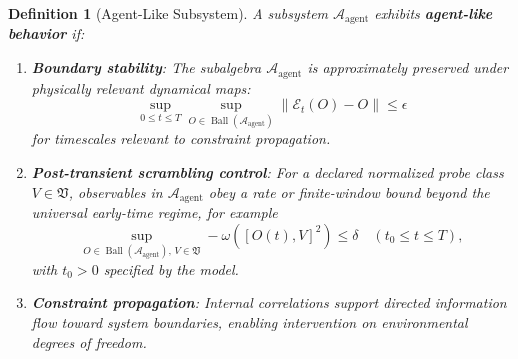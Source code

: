 \documentclass[12pt,a4paper,openany]{book}
\newtheorem{definition}[theorem]{Definition}
\begin{document}
\begin{definition}[Agent-Like Subsystem]
\label{H-C-def:agent-subsystem}
A subsystem $\mathcal{A}_{\text{agent}}$ exhibits \textbf{agent-like behavior} if:
\begin{enumerate}
\item \textbf{Boundary stability}: The subalgebra $\mathcal{A}_{\text{agent}}$ is approximately preserved under physically relevant dynamical maps:
\begin{equation}
\sup_{0\le t\le T}
\sup_{O\in\operatorname{Ball}(\mathcal A_{\text{agent}})}
\|\mathcal E_t(O)-O\|\le\epsilon
\end{equation}
for timescales relevant to constraint propagation.

\item \textbf{Post-transient scrambling control}: For a declared normalized probe class $V\in\mathfrak V$, observables in $\mathcal{A}_{\text{agent}}$ obey a rate or finite-window bound beyond the universal early-time regime, for example
\begin{equation}
\sup_{O\in\operatorname{Ball}(\mathcal A_{\text{agent}}),\,V\in\mathfrak V}
-\omega([O(t),V]^2)\le\delta
\quad(t_0\le t\le T),
\end{equation}
with $t_0>0$ specified by the model.

\item \textbf{Constraint propagation}: Internal correlations support directed information flow toward system boundaries, enabling intervention on environmental degrees of freedom.
\end{enumerate}
\end{definition}
\end{document}
